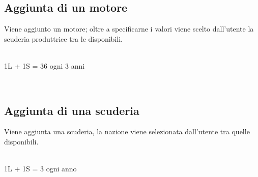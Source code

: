 \documentclass[a4paper,12pt]{report}
\begin{document}
			\subsection{Aggiunta di un motore}
			{\fontsize{12.5}{20}\selectfont
			Viene aggiunto un motore; oltre a specificarne i valori viene scelto dall'utente
			la scuderia produttrice tra le disponibili.}
			\begin{table}[!htb]
				\centering
				\begin{center}
					\newline\\
					1L + 1S = 36 ogni 3 anni\\
				\end{center}
			\end{table}\\
			\subsection{Aggiunta di una scuderia}
			{\fontsize{12.5}{20}\selectfont
			Viene aggiunta una scuderia, la nazione viene selezionata dall'utente tra quelle disponibili.}
			\begin{table}[!htb]
				\centering
				\begin{center}
				\newline\\
				1L + 1S = 3 ogni anno\\
				\end{center}
			\end{table}\\
			\pagebreak
\end{document}
